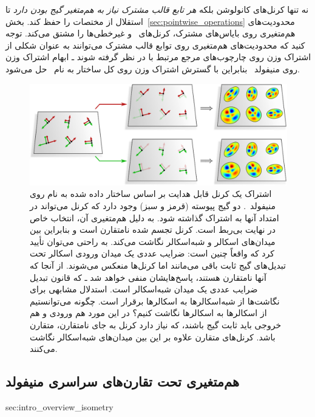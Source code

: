 نه تنها کرنل‌های کانولوشن بلکه \emph{هر تابع قالب مشترک نیاز به هم‌متغیر گیج بودن دارد} تا استقلال از مختصات \lr{$\GM$} را حفظ کند.
بخش~\ref{sec:pointwise_operations} محدودیت‌های هم‌متغیری روی بایاس‌های مشترک، کرنل‌های \onexonefarsi\ و غیرخطی‌ها را مشتق می‌کند.
توجه کنید که محدودیت‌های هم‌متغیری روی توابع قالب مشترک می‌توانند به عنوان شکلی از اشتراک وزن روی چارچوب‌های مرجع مرتبط با  در نظر گرفته شوند
ـ ابهام اشتراک وزن روی منیفولد~ بنابراین با گسترش اشتراک وزن روی کل ساختار  به نام~\lr{$\GM$} حل می‌شود.



\begin{figure}
	\centering
	\includegraphics[width=1.\textwidth]{figures/intro_kernel_alignment_reflect.pdf}
	\caption{\small
		اشتراک یک کرنل قابل هدایت \lr{$\Flip$} بر اساس ساختار \lr{$\Flip$} داده شده به نام \lr{$\RM$} روی منیفولد~.
		دو گیج پیوسته (قرمز و سبز) وجود دارد که کرنل می‌تواند در امتداد آنها به اشتراک گذاشته شود.
		به دلیل هم‌متغیری \lr{$\Flip$} آن، انتخاب خاص در نهایت بی‌ربط است.
		کرنل تجسم شده نامتقارن است و بنابراین بین میدان‌های اسکالر و شبه‌اسکالر نگاشت می‌کند.
		به راحتی می‌توان تأیید کرد که واقعاً چنین است:
		ضرایب عددی یک میدان ورودی اسکالر تحت تبدیل‌های گیج ثابت باقی می‌مانند اما کرنل‌ها منعکس می‌شوند.
		از آنجا که آنها نامتقارن هستند، پاسخ‌هایشان منفی خواهد شد ـ که قانون تبدیل ضرایب عددی یک میدان شبه‌اسکالر است.
		استدلال مشابهی برای نگاشت‌ها از شبه‌اسکالرها به اسکالرها برقرار است.
		چگونه می‌توانستیم از اسکالرها به اسکالرها نگاشت کنیم؟
		در این مورد هم ورودی و هم خروجی باید ثابت گیج باشند، که نیاز دارد کرنل به جای نامتقارن، متقارن باشد.
		کرنل‌های متقارن علاوه بر این بین میدان‌های شبه‌اسکالر نگاشت می‌کنند.
	}
	\label{fig:intro_kernel_alignment_reflect}
\end{figure}




\toclesslab\subsection{هم‌متغیری تحت تقارن‌های سراسری منیفولد}{sec:intro_overview_isometry}

